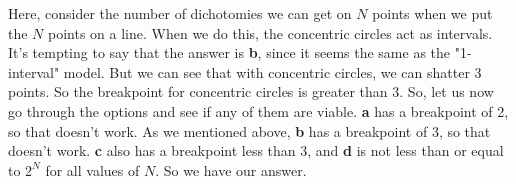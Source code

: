 \documentclass{article}
\begin{document}
\noindent Here, consider the number of dichotomies we can get on $N$ points
when we put the $N$ points on a line. When we do this, the concentric circles
act as intervals. It's tempting to say that the answer is \textbf{b}, since
it seems the same as the "1-interval" model. But we can see that with
concentric circles, we can shatter 3 points. So the breakpoint for concentric
circles is greater than 3. So, let us now go through the options and see if
any of them are viable. \textbf{a} has a breakpoint of 2, so that doesn't
work. As we mentioned above, \textbf{b} has a breakpoint of 3, so that doesn't
work. \textbf{c} also has a breakpoint less than 3, and \textbf{d} is not
less than or equal to $2^N$ for all values of $N$. So we have our answer.
\end{document}
